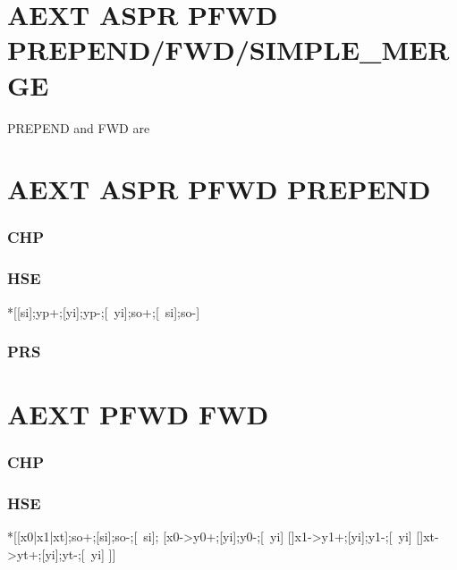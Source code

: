 \documentclass{article}
\begin{document}
\section{AEXT ASPR PFWD PREPEND/FWD/SIMPLE\_MERGE}

PREPEND and FWD are

\section{AEXT ASPR PFWD PREPEND}

\subsubsection*{CHP}

\subsubsection*{HSE}
\begin{hse}
*[[si];yp+;[yi];yp-;[~yi];so+;[~si];so-]
\end{hse}

\subsubsection*{PRS}

\section{AEXT PFWD FWD}

\subsubsection*{CHP}

\subsubsection*{HSE}

\begin{hse}
*[[x0|x1|xt];so+;[si];so-;[~si];
  [x0->y0+;[yi];y0-;[~yi]
  []x1->y1+;[yi];y1-;[~yi]
  []xt->yt+;[yi];yt-;[~yi]
 ]]
\end{hse}
\end{document}
